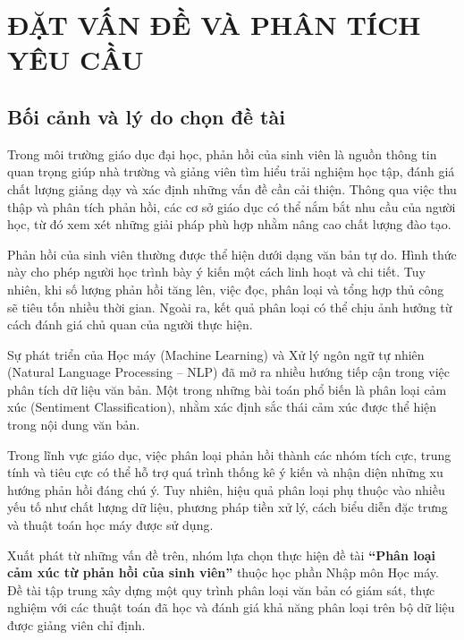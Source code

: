 
\chapter{ĐẶT VẤN ĐỀ VÀ PHÂN TÍCH YÊU CẦU}


\section{Bối cảnh và lý do chọn đề tài}

Trong môi trường giáo dục đại học, phản hồi của sinh viên là nguồn thông tin quan trọng giúp nhà trường và giảng viên tìm hiểu trải nghiệm học tập, đánh giá chất lượng giảng dạy và xác định những vấn đề cần cải thiện. Thông qua việc thu thập và phân tích phản hồi, các cơ sở giáo dục có thể nắm bắt nhu cầu của người học, từ đó xem xét những giải pháp phù hợp nhằm nâng cao chất lượng đào tạo.

Phản hồi của sinh viên thường được thể hiện dưới dạng văn bản tự do. Hình thức này cho phép người học trình bày ý kiến một cách linh hoạt và chi tiết. Tuy nhiên, khi số lượng phản hồi tăng lên, việc đọc, phân loại và tổng hợp thủ công sẽ tiêu tốn nhiều thời gian. Ngoài ra, kết quả phân loại có thể chịu ảnh hưởng từ cách đánh giá chủ quan của người thực hiện.

Sự phát triển của Học máy (Machine Learning) và Xử lý ngôn ngữ tự nhiên (Natural Language Processing -- NLP) đã mở ra nhiều hướng tiếp cận trong việc phân tích dữ liệu văn bản. Một trong những bài toán phổ biến là phân loại cảm xúc (Sentiment Classification), nhằm xác định sắc thái cảm xúc được thể hiện trong nội dung văn bản.

Trong lĩnh vực giáo dục, việc phân loại phản hồi thành các nhóm tích cực, trung tính và tiêu cực có thể hỗ trợ quá trình thống kê ý kiến và nhận diện những xu hướng phản hồi đáng chú ý. Tuy nhiên, hiệu quả phân loại phụ thuộc vào nhiều yếu tố như chất lượng dữ liệu, phương pháp tiền xử lý, cách biểu diễn đặc trưng và thuật toán học máy được sử dụng.

Xuất phát từ những vấn đề trên, nhóm lựa chọn thực hiện đề tài \textbf{``Phân loại cảm xúc từ phản hồi của sinh viên''} thuộc học phần Nhập môn Học máy. Đề tài tập trung xây dựng một quy trình phân loại văn bản có giám sát, thực nghiệm với các thuật toán đã học và đánh giá khả năng phân loại trên bộ dữ liệu được giảng viên chỉ định.

